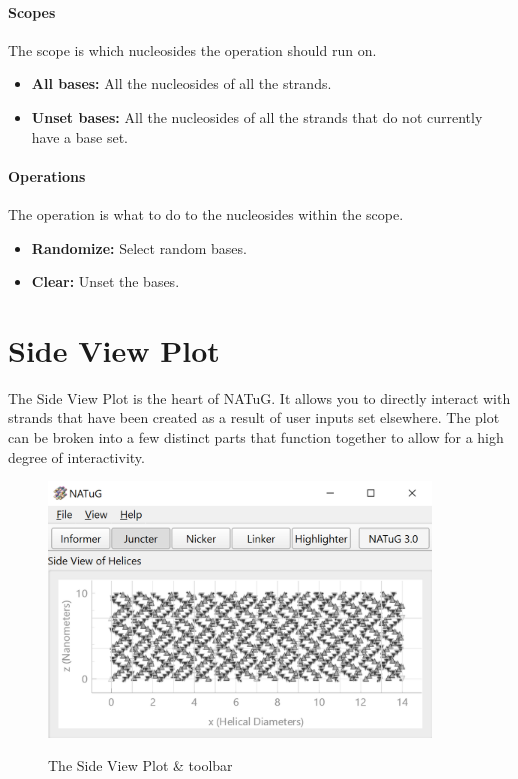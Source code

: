 \documentclass[titlepage]{article}
\begin{document}
	\paragraph{Scopes}
	The scope is which nucleosides the operation should run on.
	
	\begin{itemize}
		\item \textbf{All bases:} All the nucleosides of all the strands.
		\item \textbf{Unset bases:} All the nucleosides of all the strands that do not currently have a base set.
	\end{itemize}

	\paragraph{Operations}
	The operation is what to do to the nucleosides within the scope.
	
	\begin{itemize}
		\item \textbf{Randomize:} Select random bases.
		\item \textbf{Clear:} Unset the bases.
	\end{itemize}
	
	\section{Side View Plot}
	The Side View Plot is the heart of NATuG. It allows you to directly interact with strands that have been created as a result of user inputs set elsewhere. The plot can be broken into a few distinct parts that function together to allow for a high degree of interactivity. 
	
	\begin{figure}[h]
		\centering
		\caption{The Side View Plot \& toolbar}
		\includegraphics[width=4in]{short-side-view-overview.png}
		\label{fig:short-side-view-overview}
	\end{figure}
\end{document}
